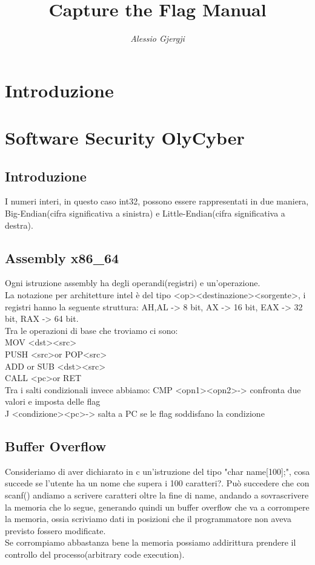 \documentclass[oneside,a4paper,11pt]{book}
\title{Capture the Flag Manual}
\author{\textit{Alessio Gjergji}}\\
\date{}
\theoremstyle{italicstyle}
\theoremstyle{normStyle}
\begin{document}
\maketitle
\tableofcontents
\chapter{Introduzione}

\chapter{Software Security OlyCyber}
\section{Introduzione}
I numeri interi, in questo caso int32, possono essere rappresentati in due maniera, Big-Endian(cifra significativa a sinistra) e Little-Endian(cifra significativa a destra).
\section{Assembly x86\_64}
Ogni istruzione assembly ha degli operandi(registri) e un'operazione.\\
La notazione per architetture intel è del tipo \textless op\textgreater\textless destinazione\textgreater\textless sorgente\textgreater, i registri hanno la seguente struttura:
AH,AL -> 8 bit, AX -> 16 bit, EAX -> 32 bit, RAX -> 64 bit.\\
Tra le operazioni di base che troviamo ci sono: \\
MOV \textless dst\textgreater\textless src\textgreater\\
PUSH \textless src\textgreater or POP\textless src\textgreater\\
ADD or SUB \textless dst\textgreater\textless src\textgreater\\
CALL \textless pc\textgreater or RET\\
Tra i salti condizionali invece abbiamo:
CMP \textless opn1\textgreater\textless opn2\textgreater -> confronta due valori e imposta delle flag\\
J \textless condizione\textgreater\textless pc\textgreater -> salta a PC se le flag soddisfano la condizione\\
\section{Buffer Overflow}
Consideriamo di aver dichiarato in c un'istruzione del tipo "char name[100];", cosa succede se l'utente ha un nome che supera i 100 caratteri?.
Può succedere che con scanf() andiamo a scrivere caratteri oltre la fine di name, andando a sovrascrivere la memoria che lo segue, generando quindi un buffer overflow che va a corrompere la memoria, ossia scriviamo dati in posizioni che il programmatore non aveva previsto fossero modificate.\\
Se corrompiamo abbastanza bene la memoria possiamo addirittura prendere il controllo del processo(arbitrary code execution).
\end{document}
